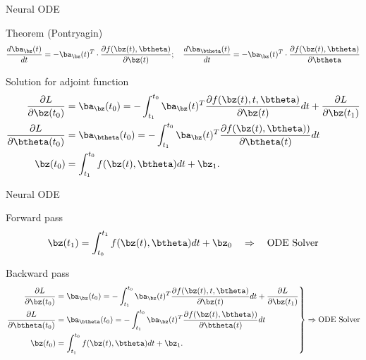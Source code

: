 \begin{frame}{Neural ODE}
	\begin{block}{Theorem (Pontryagin)}
		\vspace{-0.3cm}
		\[
		\frac{d \ba_{\bz}(t)}{dt} = - \ba_{\bz}(t)^T \cdot \frac{\partial f(\bz(t), \btheta)}{\partial \bz(t)}; \quad  \frac{d \ba_{\btheta}(t)}{dt} = - \ba_{\bz}(t)^T \cdot \frac{\partial f(\bz(t), \btheta)}{\partial \btheta}
		\]
	\end{block}
	\begin{block}{Solution for adjoint function}
		\begin{align*}
		 \frac{\partial L}{\partial \bz(t_0)} &= \ba_{\bz}(t_0) =  - \int_{t_1}^{t_0} \ba_{\bz}(t)^T \frac{\partial f(\bz(t), t, \btheta)}{\partial \bz(t)} dt + \frac{\partial L}{\partial \bz(t_1)} \\
		 \frac{\partial L}{\partial \btheta(t_0)} &= \ba_{\btheta}(t_0) =  - \int_{t_1}^{t_0} \ba_{\bz}(t)^T \frac{\partial f(\bz(t), \btheta))}{\partial \btheta(t)} dt \\
		 \bz(t_0) &= \int^{t_0}_{t_1} f(\bz(t), \btheta) d t  + \bz_1.
		\end{align*}
	\end{block}

\end{frame}
\begin{frame}{Neural ODE}
	\begin{block}{Forward pass}
		\[
		\bz(t_1) = \int^{t_1}_{t_0} f(\bz(t), \btheta) d t  + \bz_0 \quad \Rightarrow \quad \text{ODE Solver}
		\]
	\end{block}
	\begin{block}{Backward pass}
		\small
		\vspace{-0.3cm}
		\begin{equation*}
			{\left.\begin{aligned}
				\frac{\partial L}{\partial \bz(t_0)} &= \ba_{\bz}(t_0) =  - \int_{t_1}^{t_0} \ba_{\bz}(t)^T \frac{\partial f(\bz(t), t, \btheta)}{\partial \bz(t)} dt + \frac{\partial L}{\partial \bz(t_1)} \\
				\frac{\partial L}{\partial \btheta(t_0)} &= \ba_{\btheta}(t_0) =  - \int_{t_1}^{t_0} \ba_{\bz}(t)^T \frac{\partial f(\bz(t), \btheta))}{\partial \btheta(t)} dt \\
				\bz(t_0) &= \int^{t_0}_{t_1} f(\bz(t), \btheta) d t  + \bz_1.
			\end{aligned}\right\rbrace} \Rightarrow
			\text{ODE Solver}
		\end{equation*}
	\end{block}

\end{frame}

